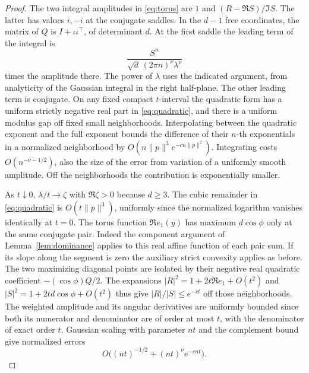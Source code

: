 \documentclass[11pt]{article}
\begin{document}
\begin{proof}
The two integral amplitudes in \eqref{eq:torus} are
\(1\) and \((R-\Re S)/\Im S\). The latter has values \(i,-i\)
at the conjugate saddles. In the \(d-1\) free coordinates,
the matrix of \(Q\) is \(I+\iota\iota^\top\), of
determinant \(d\). At the first saddle the leading term
of the integral is
\[
\frac{S^n}{\sqrt d\,(2\pi n)^\nu\lambda^\nu}
\]
times the amplitude there. The power of \(\lambda\) uses
the indicated argument, from analyticity of the Gaussian
integral in the right half-plane. The other leading term
is conjugate. On any fixed compact \(t\)-interval the
quadratic form has a uniform strictly negative real part
in \eqref{eq:quadratic}, and there is a uniform modulus
gap off fixed small neighborhoods. Interpolating between
the quadratic exponent and the full exponent bounds
the difference of their \(n\)-th exponentials in a
normalized neighborhood by
\(O(n\|p\|^3 e^{-cn\|p\|^2})\). Integrating costs
\(O(n^{-\nu-1/2})\), also the size of the error from
variation of a uniformly smooth amplitude. Off the
neighborhoods the contribution is exponentially smaller.

As \(t\downarrow0\), \(\lambda/t\to\zeta\) with
\(\Re\zeta>0\) because \(d\ge3\). The cubic remainder
in \eqref{eq:quadratic} is \(O(t\|p\|^3)\), uniformly
since the normalized logarithm vanishes identically
at \(t=0\). The torus function \(\Re e_1(y)\)
has maximum \(d\cos\phi\) only at the same conjugate pair.
Indeed the component argument of Lemma~\ref{lem:dominance}
applies to this real affine function of each pair sum.
If its slope along the segment is zero the auxiliary
strict convexity applies as before. The two maximizing
diagonal points are isolated by their negative real
quadratic coefficient \(-(\cos\phi)Q/2\).
The expansions \(|R|^2=1+2t\Re e_1+O(t^2)\) and
\(|S|^2=1+2td\cos\phi+O(t^2)\) thus give
\(|R|/|S|\le e^{-ct}\) off those neighborhoods.
The weighted amplitude and its angular derivatives are
uniformly bounded since both its numerator and denominator
are of order at most \(t\), with the denominator of exact
order \(t\). Gaussian scaling with parameter \(nt\) and
the complement bound give normalized errors
\[
O\big((nt)^{-1/2}+(nt)^\nu e^{-cnt}\big).
\]


\end{proof}
\end{document}
